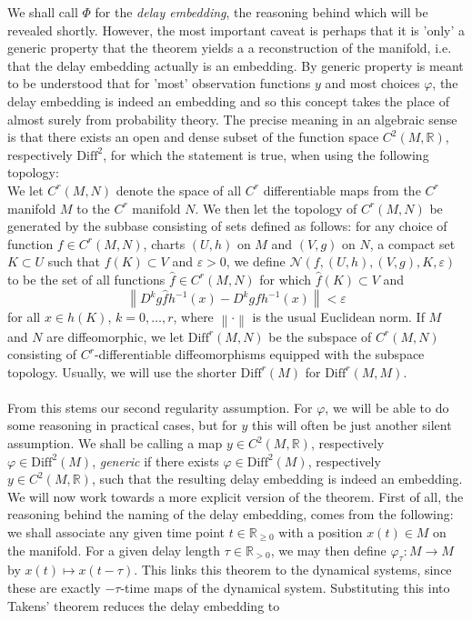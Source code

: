 \documentclass[11pt, a4paper]{memoir}
\theoremstyle{break}
\theoremstyle{break}
\theoremstyle{nonumberplain}
\newcommand{\mR}{\mathbb{R}}
\newcommand{\norm}[1]{\left\lVert#1\right\rVert}
\begin{document}
We shall call $\Phi$ for the \textit{delay embedding}, the reasoning behind which will be revealed shortly. However, the most important caveat is perhaps that it is 'only' a generic property that the theorem yields a a reconstruction of the manifold, i.e. that the delay embedding actually is an embedding. By generic property is meant to be understood that for 'most' observation functions $y$ and most choices $\varphi$, the delay embedding is indeed an embedding and so this concept takes the place of almost surely from probability theory. The precise meaning in an algebraic sense is that there exists an open and dense subset of the function space $C^2(M,\mR)$, respectively $\text{Diff}^2$, for which the statement is true, when using the following topology:\\[5pt]
We let $C^r(M,N)$ denote the space of all $C^r$ differentiable maps from the $C^r$ manifold $M$ to the $C^r$ manifold $N$. We then let the topology of $C^r(M,N)$ be generated by the subbase consisting of sets defined as follows: for any choice of function $f\in C^r(M,N)$, charts $(U,h)$ on $M$ and $(V,g)$ on $N$, a compact set $K\subset U$ such that $f(K)\subset V$ and $\varepsilon>0$, we define $\mathcal{N}(f,(U,h),(V,g),K,\varepsilon)$ to be the set of all functions $\hat{f}\in C^r(M,N)$ for which $\hat{f}(K)\subset V$ and
$$\norm{D^kg\hat{f}h^{-1}(x)-D^kgfh^{-1}(x)}<\varepsilon$$
for all $x\in h(K)$, $k=0,\ldots,r$, where $\norm{\cdot}$ is the usual Euclidean norm. If $M$ and $N$ are diffeomorphic, we let $\text{Diff}^r(M,N)$ be the subspace of $C^r(M,N)$ consisting of $C^r$-differentiable diffeomorphisms equipped with the subspace topology. Usually, we will use the shorter $\text{Diff}^r(M)$ for $\text{Diff}^r(M,M)$.\\\\
From this stems our second regularity assumption. For $\varphi$, we will be able to do some reasoning in practical cases, but for $y$ this will often be just another silent assumption. We shall be calling a map $y\in C^2(M,\mR)$, respectively $\varphi\in \text{Diff}^2(M)$, \textit{generic} if there exists $\varphi\in \text{Diff}^2(M)$, respectively $y\in C^2(M,\mR)$, such that the resulting delay embedding is indeed an embedding.
We will now work towards a more explicit version of the theorem. First of all, the reasoning behind the naming of the delay embedding, comes from the following: we shall associate any given time point $t\in \mR_{\geqslant 0}$ with a position $x(t)\in M$ on the manifold. For a given delay length $\tau\in \mR_{>0}$, we may then define $\varphi_\tau: M\to M$ by $x(t)\mapsto x(t-\tau)$. This links this theorem to the dynamical systems, since these are exactly $-\tau$-time maps of the dynamical system. Substituting this into Takens' theorem reduces the delay embedding to
\end{document}
